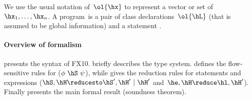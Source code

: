 We use the usual notation of~$\ol{\hx}$ to represent a vector or set of~$\hx_1, \ldots,\hx_n$.
A program~\hP is a pair of class declarations~$\ol{\hL}$ (that is assumed to be global information)
    and a statement \hS.

\paragraph{Overview of formalism}
 presents the syntax of FX10.
 briefly describes the type
system.  defines the flow-sensitive rules for
    ($\phi~\hS~\psi$), while
     gives the reduction rules for statements
    and expressions ($\hS,\hH \reducesto \hS',\hH' ~|~\hH'$
    and~$\he,\hH \reduce \hl,\hH'$). Finally 
    presents the main formal result (soundness theorem).




